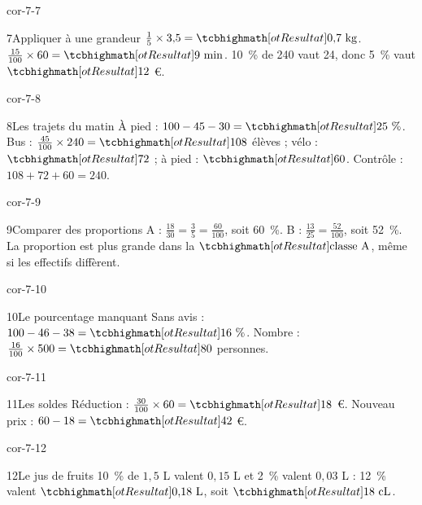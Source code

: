 \begin{blocLivre}{cor-7-7}\begin{corrige}{7}{Appliquer à une grandeur}
$\frac15\times3{,}5=\res{0{,}7\ \mathrm{kg}}$. $\frac{15}{100}\times60=\res{9\ \mathrm{min}}$. 10~\% de 240 vaut 24, donc 5~\% vaut $\res{12}$ €.
\end{corrige}\end{blocLivre}
\begin{blocLivre}{cor-7-8}\begin{corrige}{8}{Les trajets du matin}
À pied : $100-45-30=\res{25\text{~\%}}$. Bus : $\frac{45}{100}\times240=\res{108}$ élèves ; vélo : $\res{72}$ ; à pied : $\res{60}$. Contrôle : $108+72+60=240$.
\label{fig-cor-7-8}
\end{corrige}\end{blocLivre}
\begin{blocLivre}{cor-7-9}\begin{corrige}{9}{Comparer des proportions}
A : $\frac{18}{30}=\frac35=\frac{60}{100}$, soit 60~\%. B : $\frac{13}{25}=\frac{52}{100}$, soit 52~\%. La proportion est plus grande dans la $\res{\text{classe A}}$, même si les effectifs diffèrent.
\end{corrige}\end{blocLivre}
\begin{blocLivre}{cor-7-10}\begin{corrige}{10}{Le pourcentage manquant}
Sans avis : $100-46-38=\res{16\text{~\%}}$. Nombre : $\frac{16}{100}\times500=\res{80}$ personnes.
\end{corrige}\end{blocLivre}
\begin{blocLivre}{cor-7-11}\begin{corrige}{11}{Les soldes}
Réduction : $\frac{30}{100}\times60=\res{18}$ €. Nouveau prix : $60-18=\res{42}$ €.
\end{corrige}\end{blocLivre}
\begin{blocLivre}{cor-7-12}\begin{corrige}{12}{Le jus de fruits}
10~\% de $1{,}5$ L valent $0{,}15$ L et 2~\% valent $0{,}03$ L : 12~\% valent $\res{0{,}18\ \mathrm{L}}$, soit $\res{18\ \mathrm{cL}}$.
\end{corrige}\end{blocLivre}
